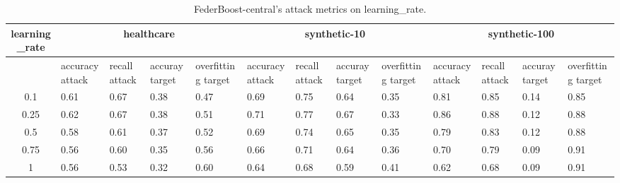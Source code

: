 \begin{table*}[]\centering
\begin{tabular}{|c| *{12}{m{1.0cm}|}}
\hline\rowcolor{gray!50}
\cellcolor{gray!80} learning_rate & \multicolumn{4}{c|}{healthcare} & \multicolumn{4}{c|}{synthetic-10} & \multicolumn{4}{c|}{synthetic-100}\\\hline 
& accuracy attack & recall attack & accuray target & overfitting target & accuracy attack & recall attack & accuray target & overfitting target & accuracy attack & recall attack & accuray target & overfitting target\\\hline
0.1 & 0.61 & 0.67 & 0.38 & 0.47 & 0.69 & 0.75 & 0.64 & 0.35 & 0.81 & 0.85 & 0.14 & 0.85\\ \hline
0.25 & 0.62 & 0.67 & 0.38 & 0.51 & 0.71 & 0.77 & 0.67 & 0.33 & 0.86 & 0.88 & 0.12 & 0.88\\ \hline
0.5 & 0.58 & 0.61 & 0.37 & 0.52 & 0.69 & 0.74 & 0.65 & 0.35 & 0.79 & 0.83 & 0.12 & 0.88\\ \hline
0.75 & 0.56 & 0.60 & 0.35 & 0.56 & 0.66 & 0.71 & 0.64 & 0.36 & 0.70 & 0.79 & 0.09 & 0.91\\ \hline
1 & 0.56 & 0.53 & 0.32 & 0.60 & 0.64 & 0.68 & 0.59 & 0.41 & 0.62 & 0.68 & 0.09 & 0.91\\ \hline
\end{tabular} 
\caption{FederBoost-central's attack metrics on learning_rate.}
\label{tab:experiment1_learning_rate}
\end{table*}
